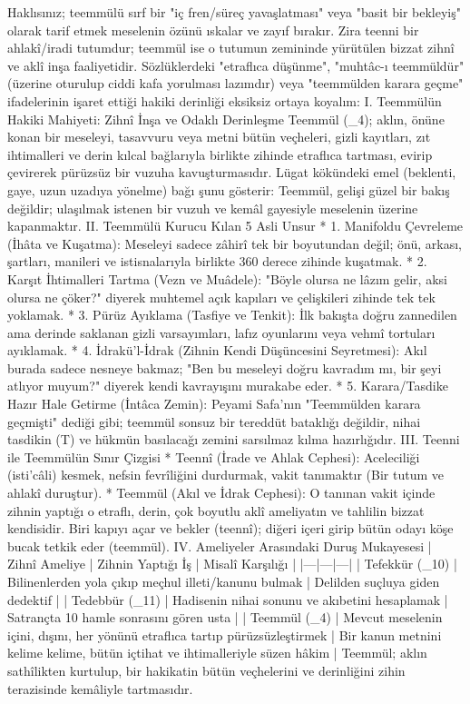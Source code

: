 \documentclass[11pt,a4paper]{article}
\begin{document}
Haklısınız; teemmülü sırf bir "iç fren/süreç yavaşlatması" veya "basit bir bekleyiş" olarak tarif etmek meselenin özünü ıskalar ve zayıf bırakır. Zira teenni bir ahlakî/iradi tutumdur; teemmül ise o tutumun zemininde yürütülen bizzat zihnî ve aklî inşa faaliyetidir.
Sözlüklerdeki "etraflıca düşünme", "muhtâc-ı teemmüldür" (üzerine oturulup ciddi kafa yorulması lazımdır) veya "teemmülden karara geçme" ifadelerinin işaret ettiği hakiki derinliği eksiksiz ortaya koyalım:
I. Teemmülün Hakiki Mahiyeti: Zihnî İnşa ve Odaklı Derinleşme
Teemmül (_4); aklın, önüne konan bir meseleyi, tasavvuru veya metni bütün veçheleri, gizli kayıtları, zıt ihtimalleri ve derin kılcal bağlarıyla birlikte zihinde etraflıca tartması, evirip çevirerek pürüzsüz bir vuzuha kavuşturmasıdır.
Lügat kökündeki emel (beklenti, gaye, uzun uzadıya yönelme) bağı şunu gösterir: Teemmül, gelişi güzel bir bakış değildir; ulaşılmak istenen bir vuzuh ve kemâl gayesiyle meselenin üzerine kapanmaktır.
II. Teemmülü Kurucu Kılan 5 Asli Unsur
 * 1. Manifoldu Çevreleme (İhâta ve Kuşatma):
   Meseleyi sadece zâhirî tek bir boyutundan değil; önü, arkası, şartları, manileri ve istisnalarıyla birlikte 360 derece zihinde kuşatmak.
 * 2. Karşıt İhtimalleri Tartma (Vezn ve Muâdele):
   "Böyle olursa ne lâzım gelir, aksi olursa ne çöker?" diyerek muhtemel açık kapıları ve çelişkileri zihinde tek tek yoklamak.
 * 3. Pürüz Ayıklama (Tasfiye ve Tenkit):
   İlk bakışta doğru zannedilen ama derinde saklanan gizli varsayımları, lafız oyunlarını veya vehmî tortuları ayıklamak.
 * 4. İdrakü'l-İdrak (Zihnin Kendi Düşüncesini Seyretmesi):
   Akıl burada sadece nesneye bakmaz; "Ben bu meseleyi doğru kavradım mı, bir şeyi atlıyor muyum?" diyerek kendi kavrayışını murakabe eder.
 * 5. Karara/Tasdike Hazır Hale Getirme (İntâca Zemin):
   Peyami Safa'nın "Teemmülden karara geçmişti" dediği gibi; teemmül sonsuz bir tereddüt bataklığı değildir, nihai tasdikin (T) ve hükmün basılacağı zemini sarsılmaz kılma hazırlığıdır.
III. Teenni ile Teemmülün Sınır Çizgisi
 * Teennî (İrade ve Ahlak Cephesi):
   Aceleciliği (isti'câli) kesmek, nefsin fevrîliğini durdurmak, vakit tanımaktır (Bir tutum ve ahlakî duruştur).
 * Teemmül (Akıl ve İdrak Cephesi):
   O tanınan vakit içinde zihnin yaptığı o etraflı, derin, çok boyutlu aklî ameliyatın ve tahlilin bizzat kendisidir. Biri kapıyı açar ve bekler (teennî); diğeri içeri girip bütün odayı köşe bucak tetkik eder (teemmül).
IV. Ameliyeler Arasındaki Duruş Mukayesesi
| Zihnî Ameliye | Zihnin Yaptığı İş | Misalî Karşılığı |
|---|---|---|
| Tefekkür (_{10}) | Bilinenlerden yola çıkıp meçhul illeti/kanunu bulmak | Delilden suçluya giden dedektif |
| Tedebbür (_{11}) | Hadisenin nihai sonunu ve akıbetini hesaplamak | Satrançta 10 hamle sonrasını gören usta |
| Teemmül (_4) | Mevcut meselenin içini, dışını, her yönünü etraflıca tartıp pürüzsüzleştirmek | Bir kanun metnini kelime kelime, bütün içtihat ve ihtimalleriyle süzen hâkim |
Teemmül; aklın sathîlikten kurtulup, bir hakikatin bütün veçhelerini ve derinliğini zihin terazisinde kemâliyle tartmasıdır.
\end{document}
